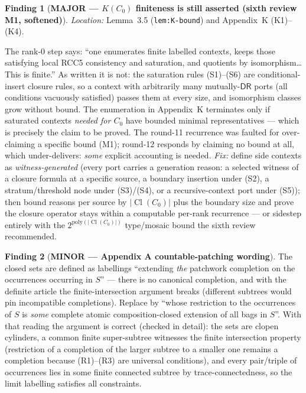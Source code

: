 \documentclass[11pt]{article}
\theoremstyle{definition}
\newtheorem{finding}{Finding}
\newcommand{\DR}{\mathsf{DR}}
\newcommand{\Cl}{\operatorname{Cl}}
\newcommand{\code}[1]{\texttt{#1}}
\begin{document}
\begin{finding}[\textbf{MAJOR --- $K(C_0)$ finiteness is still asserted
(sixth review M1, softened)}]\label{f:kbound}
\emph{Location:} Lemma~3.5 (\code{lem:K-bound}) and Appendix~K (K1)--(K4).

The rank-0 step says: ``one enumerates finite labelled contexts, keeps
those satisfying local RCC5 consistency and saturation, and quotients by
isomorphism\ldots{}  This is finite.''  As written it is not: the
saturation rules (S1)--(S6) are conditional-insert closure rules, so a
context with arbitrarily many mutually-$\DR$ ports (all conditions
vacuously satisfied) passes them at every size, and isomorphism classes
grow without bound.  The enumeration in Appendix~K terminates only if
saturated contexts \emph{needed for $C_0$} have bounded minimal
representatives --- which is precisely the claim to be proved.  The round-11
recurrence was faulted for over-claiming a specific bound (M1); round-12
responds by claiming no bound at all, which under-delivers: \emph{some}
explicit accounting is needed.  \emph{Fix:} define side contexts as
\emph{witness-generated} (every port carries a generation reason: a
selected witness of a closure formula at a specific source, a boundary
insertion under (S2), a stratum/threshold node under (S3)/(S4), or a
recursive-context port under (S5)); then bound reasons per source by
$|\Cl(C_0)|$ plus the boundary size and prove the closure operator stays
within a computable per-rank recurrence --- or sidestep entirely with the
$2^{\mathrm{poly}(|\Cl(C_0)|)}$ type/mosaic bound the sixth review
recommended.
\end{finding}

\begin{finding}[\textbf{MINOR --- Appendix A countable-patching wording}]
\label{f:appA}
The closed sets are defined as labellings ``extending \emph{the} patchwork
completion on the occurrences occurring in $S$'' --- there is no canonical
completion, and with the definite article the finite-intersection argument
breaks (different subtrees would pin incompatible completions).  Replace by
``whose restriction to the occurrences of $S$ is \emph{some} complete
atomic composition-closed extension of all bags in $S$''.  With that
reading the argument is correct (checked in detail): the sets are clopen
cylinders, a common finite super-subtree witnesses the finite intersection
property (restriction of a completion of the larger subtree to a smaller
one remains a completion because (R1)--(R3) are universal conditions),
and every pair/triple of occurrences lies in some finite connected subtree
by trace-connectedness, so the limit labelling satisfies all constraints.
\end{finding}
\end{document}
